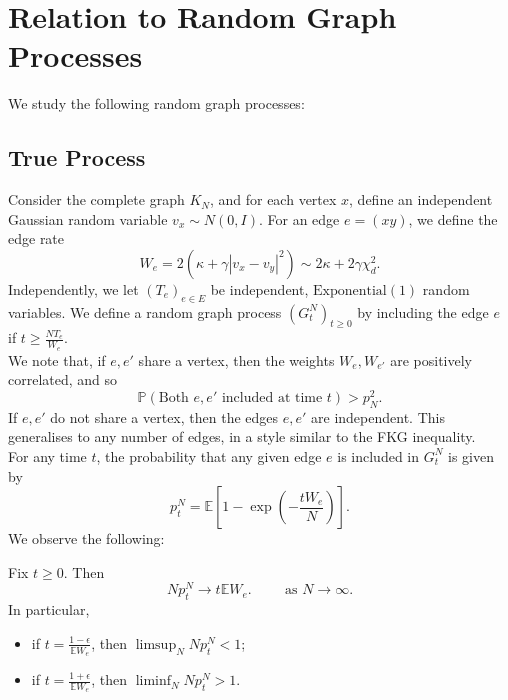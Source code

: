 \section{Relation to Random Graph Processes}\label{sec:rg}

We study the following random graph processes:

\subsection{True Process}

Consider the complete graph $K_N$, and for each vertex $x$, define an independent Gaussian random variable $v_x\sim N(0,I).$ For an edge $e=(xy)$,  we define the edge rate \begin{equation*} W_e=2(\kappa+\gamma|v_x-v_y|^2) \sim 2\kappa+2\gamma \chi^2_d. \end{equation*} Independently, we let $(T_e)_{e\in E}$ be independent, $\text{Exponential}(1)$ random variables. We define a random graph process $(G^N_t)_{t\geq 0}$ by including the edge $e$ if $
    t \geq \frac{NT_e}{W_e}$.  \medskip \\ We note that, if $e, e'$ share a vertex, then the weights $W_e, W_{e'}$ are positively correlated, and so \begin{equation*} \mathbb{P}(\text{Both $e, e'$ included at time $t$})>p_N^2.\end{equation*} If $e, e'$ do not share a vertex, then the edges $e,e'$ are independent. This generalises to any number of edges, in a style similar to the FKG inequality. \medskip \\  For any time $t$, the probability that any given edge $e$ is included in $G^N_t$ is given by \begin{equation*}
        p^N_t=\mathbb{E}\left[1-\exp\left(-\frac{tW_e}{N}\right)\right].
    \end{equation*} We observe the following: \begin{lemma}\label{lemma:cutoff time} Fix $t\geq 0$. Then \begin{equation*}
        Np^N_t \rightarrow t\mathbb{E}W_e. \hspace{1cm} \text{as } N \rightarrow \infty.
    \end{equation*} In particular, \begin{itemize}
        \item if $t=\frac{1-\epsilon}{\mathbb{E}W_e}$, then $\limsup_N Np^N_t<1$;
        \item if $t=\frac{1+\epsilon}{\mathbb{E}W_e}$, then $\liminf_N Np^N_t>1$.
    \end{itemize}\end{lemma}
